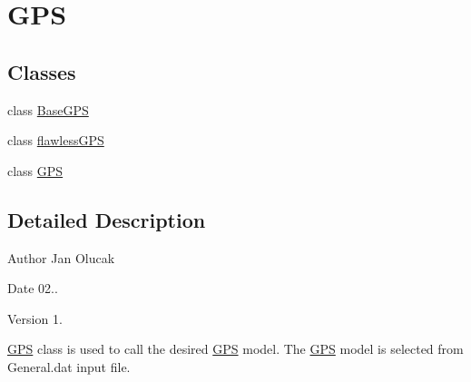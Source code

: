 \hypertarget{group___g_p_s}{}\section{G\+PS}
\label{group___g_p_s}
\subsection*{Classes}
\begin{DoxyCompactItemize}
\item 
class \hyperlink{class_base_g_p_s}{Base\+G\+PS}
\item 
class \hyperlink{classflawless_g_p_s}{flawless\+G\+PS}
\item 
class \hyperlink{class_g_p_s}{G\+PS}
\end{DoxyCompactItemize}


\subsection{Detailed Description}
\begin{DoxyAuthor}{Author}
Jan Olucak 
\end{DoxyAuthor}
\begin{DoxyDate}{Date}
02.. 
\end{DoxyDate}
\begin{DoxyVersion}{Version}
1.
\end{DoxyVersion}
\hyperlink{class_g_p_s}{G\+PS} class is used to call the desired \hyperlink{class_g_p_s}{G\+PS} model. The \hyperlink{class_g_p_s}{G\+PS} model is selected from General.\+dat input file. 